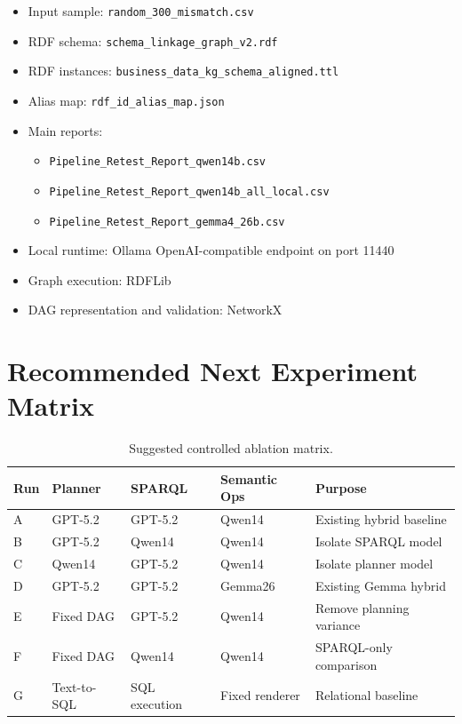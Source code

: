 \documentclass[11pt]{article}
\begin{document}
\begin{itemize}[leftmargin=*]
    \item Input sample: \texttt{random\_300\_mismatch.csv}
    \item RDF schema: \texttt{schema\_linkage\_graph\_v2.rdf}
    \item RDF instances: \texttt{business\_data\_kg\_schema\_aligned.ttl}
    \item Alias map: \texttt{rdf\_id\_alias\_map.json}
    \item Main reports:
    \begin{itemize}
        \item \texttt{Pipeline\_Retest\_Report\_qwen14b.csv}
        \item \texttt{Pipeline\_Retest\_Report\_qwen14b\_all\_local.csv}
        \item \texttt{Pipeline\_Retest\_Report\_gemma4\_26b.csv}
    \end{itemize}
    \item Local runtime: Ollama OpenAI-compatible endpoint on port 11440
    \item Graph execution: RDFLib
    \item DAG representation and validation: NetworkX
\end{itemize}

\section{Recommended Next Experiment Matrix}

\begin{table}[H]
\centering
\small
\caption{Suggested controlled ablation matrix.}
\begin{tabular}{lllll}
\toprule
\textbf{Run} & \textbf{Planner} & \textbf{SPARQL} & \textbf{Semantic Ops} & \textbf{Purpose}\\
\midrule
A & GPT-5.2 & GPT-5.2 & Qwen14 & Existing hybrid baseline\\
B & GPT-5.2 & Qwen14 & Qwen14 & Isolate SPARQL model\\
C & Qwen14 & GPT-5.2 & Qwen14 & Isolate planner model\\
D & GPT-5.2 & GPT-5.2 & Gemma26 & Existing Gemma hybrid\\
E & Fixed DAG & GPT-5.2 & Qwen14 & Remove planning variance\\
F & Fixed DAG & Qwen14 & Qwen14 & SPARQL-only comparison\\
G & Text-to-SQL & SQL execution & Fixed renderer & Relational baseline\\
\bottomrule
\end{tabular}
\end{table}
\end{document}
